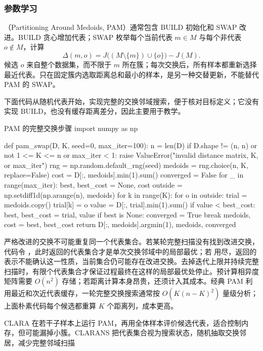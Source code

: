 \subsubsection{参数学习}

（Partitioning Around Medoids, PAM）通常包含 BUILD 初始化和 SWAP 改进。BUILD 贪心增加代表；SWAP 枚举每个当前代表 $m\in M$ 与每个非代表 $o\notin M$，计算
\[
 \Delta(m,o)=
 J\bigl((M\setminus\{m\})\cup\{o\}\bigr)-J(M).
\]
候选 $o$ 来自整个数据集，而不限于 $m$ 所在簇；每次交换后，所有样本都重新选择最近代表。只在固定簇内选取距离总和最小的样本，是另一种交替更新，不能替代 PAM 的 SWAP。

下面代码从随机代表开始，实现完整的交换邻域搜索，便于核对目标定义；它没有实现 BUILD，也没有缓存距离差分，因此主要用于教学。

\begin{codeblock}[language=Python,label={code:clustering-pam}]{PAM 的完整交换步骤}
import numpy as np

def pam_swap(D, K, seed=0, max_iter=100):
    n = len(D)
    if D.shape != (n, n) or not 1 <= K <= n or max_iter < 1:
        raise ValueError("invalid distance matrix, K, or max_iter")
    rng = np.random.default_rng(seed)
    medoids = rng.choice(n, K, replace=False)
    cost = D[:, medoids].min(1).sum()
    converged = False
    for _ in range(max_iter):
        best, best_cost = None, cost
        outside = np.setdiff1d(np.arange(n), medoids)
        for k in range(K):
            for o in outside:
                trial = medoids.copy()
                trial[k] = o
                value = D[:, trial].min(1).sum()
                if value < best_cost:
                    best, best_cost = trial, value
        if best is None:
            converged = True
            break
        medoids, cost = best, best_cost
    return D[:, medoids].argmin(1), medoids, converged
\end{codeblock}

严格改进的交换不可能重复同一个代表集合。若某轮完整扫描没有找到改进交换，代码令 ，此时返回的代表集合才是单次交换邻域中的局部最优；若  用尽，返回的  表示不能确认这一性质，当前集合仍可能存在改进交换。去掉迭代上限并持续完整扫描时，有限个代表集合才保证过程最终在这样的局部最优处停止。预计算相异度矩阵需要 $O(n^2)$ 存储；若距离计算本身昂贵，还须计入其成本。经典 PAM 利用最近和次近代表缓存，一轮完整交换搜索通常按 $O(K(n-K)^2)$ 量级分析；上面朴素代码每个候选都重算 $K$ 个距离列，成本更高。

CLARA 在若干子样本上运行 PAM，再用全体样本评价候选代表，适合控制内存，但可能漏掉小簇。CLARANS 把代表集合视为搜索状态，随机抽取交换邻居，减少完整邻域扫描

